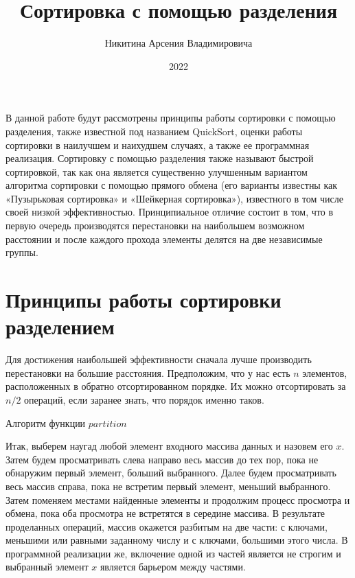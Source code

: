 \documentclass[bachelor, och, labwork]{shiza}
\begin{document}

\title{Сортировка с помощью разделения}





\author{Никитина Арсения Владимировича}



\date{2022}

\maketitle

\tableofcontents

\intro
В данной работе будут рассмотрены принципы работы сортировки с помощью 
разделения, также известной под названием QuickSort, оценки работы сортировки в 
наилучшем и наихудшем случаях, а также ее программная реализация.
Сортировку с помощью разделения также называют быстрой сортировкой, так как она
является существенно улучшенным вариантом алгоритма сортировки с помощью 
прямого обмена (его варианты известны как «Пузырьковая сортировка» и «Шейкерная 
сортировка»), известного в том числе своей низкой эффективностью. Принципиальное 
отличие состоит в том, что в первую очередь производятся перестановки на 
наибольшем возможном расстоянии и после каждого прохода элементы делятся на две 
независимые группы.

\section{Принципы работы сортировки разделением}

Для достижения наибольшей эффективности сначала лучше производить перестановки
на большие расстояния. Предположим, что у нас есть $n$ элементов, расположенных
в обратно отсортированном порядке. Их можно отсортировать за $n/2$ операций,
если заранее знать, что порядок именно таков.

\begin{center}Алгоритм функции $partition$\end{center}

Итак, выберем наугад любой элемент входного массива данных и назовем его $x$.
Затем будем просматривать слева направо весь массив до тех пор, пока не
обнаружим первый элемент, больший выбранного. Далее будем просматривать весь
массив справа, пока не встретим первый элемент, меньший выбранного.
Затем поменяем местами найденные элементы и продолжим процесс просмотра и обмена,
пока оба просмотра не встретятся в середине массива. В результате 
проделанных операций, массив окажется разбитым на две части: с ключами, меньшими
или равными заданному числу и с ключами, большими этого числа.
В программной реализации же, включение одной из частей является не строгим и 
выбранный элемент $x$ является барьером между частями.
\end{document}
